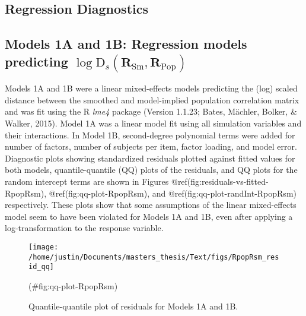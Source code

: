 \clearpage
\makeatletter
\efloat@restorefloats
\makeatother


\begin{appendix}
\hypertarget{regression-diagnostics}{%
\section{Regression Diagnostics}\label{regression-diagnostics}}

\hypertarget{models-1a-and-1b-regression-models-predicting-log-textrmd_smathbfr_textrmsm-mathbfr_textrmpop}{%
\subsection{\texorpdfstring{Models 1A and 1B: Regression models
predicting
\(\log \textrm{D}_s(\mathbf{R}_{\textrm{Sm}}, \mathbf{R}_{\textrm{Pop}})\)}{Models 1A and 1B: Regression models predicting \textbackslash log \textbackslash textrm\{D\}\_s(\textbackslash mathbf\{R\}\_\{\textbackslash textrm\{Sm\}\}, \textbackslash mathbf\{R\}\_\{\textbackslash textrm\{Pop\}\})}}\label{models-1a-and-1b-regression-models-predicting-log-textrmd_smathbfr_textrmsm-mathbfr_textrmpop}}

Models 1A and 1B were a linear mixed-effects models predicting the (log)
scaled distance between the smoothed and model-implied population
correlation matrix and was fit using the R \emph{lme4} package (Version
1.1.23; Bates, Mächler, Bolker, \& Walker, 2015). Model 1A was a linear
model fit using all simulation variables and their interactions. In
Model 1B, second-degree polynomial terms were added for number of
factors, number of subjects per item, factor loading, and model error.
Diagnostic plots showing standardized residuals plotted against fitted
values for both models, quantile-quantile (QQ) plots of the residuals,
and QQ plots for the random intercept terms are shown in Figures
@ref(fig:residuals-vs-fitted-RpopRsm), @ref(fig:qq-plot-RpopRsm), and
@ref(fig:qq-plot-randInt-RpopRsm) respectively. These plots show that
some assumptions of the linear mixed-effects model seem to have been
violated for Models 1A and 1B, even after applying a log-transformation
to the response variable.

\begin{figure}

{\centering \texttt{[image: /home/justin/Documents/masters\_thesis/Text/figs/RpopRsm\_resid\_qq]} 

}

\caption{Quantile-quantile plot of residuals for Models 1A and 1B.}(\#fig:qq-plot-RpopRsm)
\end{figure}


\end{appendix}
